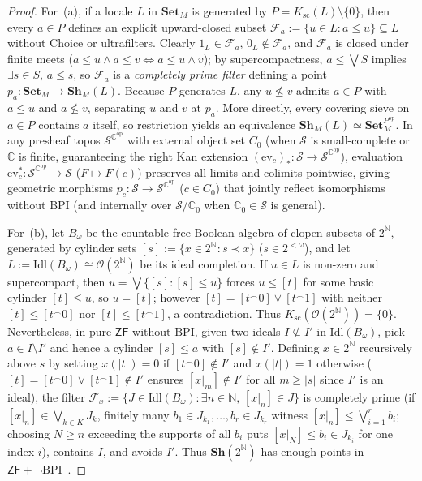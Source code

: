 \documentclass[10pt,twoside,openright]{book}
\theoremstyle{crmplain}
\theoremstyle{crmdef}
\theoremstyle{crmremark}
\begin{document}
\begin{proof}
For~(a), if a locale $L$ in $\mathbf{Set}_M$ is generated by $P = K_{\mathrm{sc}}(L) \setminus \{0\}$, then every $a \in P$ defines an explicit upward-closed subset $\mathcal{F}_a := \{u \in L : a \le u\} \subseteq L$ without Choice or ultrafilters. Clearly $1_L \in \mathcal{F}_a$, $0_L \notin \mathcal{F}_a$, and $\mathcal{F}_a$ is closed under finite meets ($a \le u \wedge a \le v \iff a \le u \wedge v$); by supercompactness, $a \le \bigvee S$ implies $\exists s \in S,\, a \le s$, so $\mathcal{F}_a$ is a \emph{completely prime filter} defining a point $p_a : \mathbf{Set}_M \to \mathbf{Sh}_M(L)$. Because $P$ generates $L$, any $u \not\le v$ admits $a \in P$ with $a \le u$ and $a \not\le v$, separating $u$ and $v$ at $p_a$. More directly, every covering sieve on $a \in P$ contains $a$ itself, so restriction yields an equivalence $\mathbf{Sh}_M(L) \simeq \mathbf{Set}_M^{P^{\mathrm{op}}}$. In any presheaf topos $\mathcal{S}^{\mathbb{C}^{\mathrm{op}}}$ with external object set $C_0$ (when $\mathcal{S}$ is small-complete or $\mathbb{C}$ is finite, guaranteeing the right Kan extension $(\mathrm{ev}_c)_* : \mathcal{S} \to \mathcal{S}^{\mathbb{C}^{\mathrm{op}}}$), evaluation $\mathrm{ev}_c^* : \mathcal{S}^{\mathbb{C}^{\mathrm{op}}} \to \mathcal{S}$ ($F \mapsto F(c)$) preserves all limits and colimits pointwise, giving geometric morphisms $p_c : \mathcal{S} \to \mathcal{S}^{\mathbb{C}^{\mathrm{op}}}$ ($c \in C_0$) that jointly reflect isomorphisms without $\mathrm{BPI}$ (and internally over $\mathcal{S}/\mathbb{C}_0$ when $\mathbb{C}_0 \in \mathcal{S}$ is general).

For~(b), let $B_\omega$ be the countable free Boolean algebra of clopen subsets of $2^{\mathbb{N}}$, generated by cylinder sets $[s] := \{x \in 2^{\mathbb{N}} : s \prec x\}$ ($s \in 2^{<\omega}$), and let $L := \mathrm{Idl}(B_\omega) \cong \mathcal{O}(2^{\mathbb{N}})$ be its ideal completion. If $u \in L$ is non-zero and supercompact, then $u = \bigvee \{[s] : [s] \le u\}$ forces $u \le [t]$ for some basic cylinder $[t] \le u$, so $u = [t]$; however $[t] = [t^\frown 0] \vee [t^\frown 1]$ with neither $[t] \le [t^\frown 0]$ nor $[t] \le [t^\frown 1]$, a contradiction. Thus $K_{\mathrm{sc}}(\mathcal{O}(2^{\mathbb{N}})) = \{0\}$. Nevertheless, in pure $\mathsf{ZF}$ without $\mathrm{BPI}$, given two ideals $I \not\subseteq I'$ in $\mathrm{Idl}(B_\omega)$, pick $a \in I \setminus I'$ and hence a cylinder $[s] \le a$ with $[s] \notin I'$. Defining $x \in 2^{\mathbb{N}}$ recursively above $s$ by setting $x(|t|) = 0$ if $[t^\frown 0] \notin I'$ and $x(|t|) = 1$ otherwise ($[t] = [t^\frown 0] \vee [t^\frown 1] \notin I'$ ensures $[x|_m] \notin I'$ for all $m \ge |s|$ since $I'$ is an ideal), the filter $\mathcal{F}_x := \{J \in \mathrm{Idl}(B_\omega) : \exists n \in \mathbb{N},\, [x|_n] \in J\}$ is completely prime (if $[x|_n] \in \bigvee_{k \in K} J_k$, finitely many $b_1 \in J_{k_1}, \dots, b_r \in J_{k_r}$ witness $[x|_n] \le \bigvee_{i=1}^r b_i$; choosing $N \ge n$ exceeding the supports of all $b_i$ puts $[x|_N] \le b_i \in J_{k_i}$ for one index $i$), contains $I$, and avoids $I'$. Thus $\mathbf{Sh}(2^{\mathbb{N}})$ has enough points in $\mathsf{ZF} + \neg\mathrm{BPI}$~\cite{Johnstone82}.
\end{proof}
\end{document}
